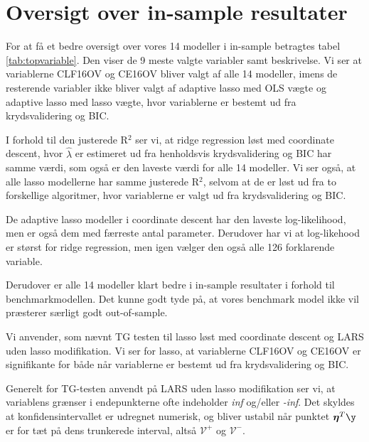 \section{Oversigt over in-sample resultater} 
For at få et bedre oversigt over vores 14 modeller i in-sample betragtes tabel \ref{tab:topvariable}. Den viser de 9 meste valgte variabler samt beskrivelse. Vi ser at variablerne \textcolor{blue3}{CLF16OV} og \textcolor{blue3}{CE16OV} bliver valgt af alle 14 modeller, imens de resterende variabler ikke bliver valgt af adaptive lasso med OLS vægte og adaptive lasso med lasso vægte, hvor variablerne er bestemt ud fra  krydsvalidering og BIC. 



I forhold til den justerede R$^2$ ser vi, at ridge regression løst med coordinate descent, hvor $\widehat{\lambda}$ er estimeret ud fra henholdsvis krydsvalidering og BIC har samme værdi, som også er den laveste værdi for alle 14 modeller. 
Vi ser også, at alle lasso modellerne har samme justerede R$^2$, selvom at de er løst ud fra to forskellige algoritmer, hvor variablerne er valgt ud fra krydsvalidering og BIC. 

De adaptive lasso modeller i coordinate descent har den laveste log-likelihood, men er også dem med færreste antal parameter. Derudover har vi at log-likehood er størst for ridge regression, men igen vælger den også alle 126 forklarende variable. 

Derudover er alle 14 modeller klart bedre i in-sample resultater i forhold til benchmarkmodellen. Det kunne godt tyde på, at vores benchmark model ikke vil præsterer særligt godt out-of-sample. 



Vi anvender, som nævnt TG testen til lasso løst med coordinate descent og LARS uden lasso modifikation. Vi ser for lasso, at variablerne \textcolor{blue3}{CLF16OV} og \textcolor{blue3}{CE16OV} er signifikante for både når variablerne er bestemt ud fra krydsvalidering og BIC. 




Generelt for TG-testen anvendt på LARS uden lasso modifikation ser vi, at variablens grænser i endepunkterne ofte indeholder \textit{inf} og/eller \textit{-inf}. 
Det skyldes at konfidensintervallet er udregnet numerisk, og bliver ustabil når punktet $\boldsymbol{\eta}^T \y$ er for tæt på dens trunkerede interval, altså $\mathcal{V^+}$ og $\mathcal{V^-}$. 










